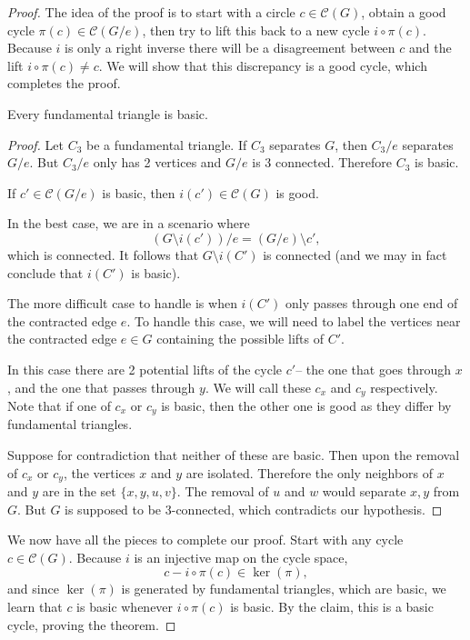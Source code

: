 \begin{proof}
	The idea of the proof is to start with a circle $c\in \mathcal C(G)$, obtain a good cycle $\pi(c)\in \mathcal C(G/e)$, then try to lift this back to a new cycle $i\circ \pi(c)$. 
	Because $i$ is only a right inverse there will be a disagreement between $c$ and the lift $i\circ \pi(c)\neq c$.
	We will show that this discrepancy is a good cycle, which completes the proof. 
	\begin{claim}
		Every fundamental triangle is basic.
	\end{claim}
	\begin{proof}
	 Let $C_3$ be a fundamental triangle. If $C_3$ separates $G$, then $C_3/e$ separates $G/e$. But $C_3/e$ only has 2 vertices and  $G/e$ is 3 connected. Therefore $C_3$ is basic. 
	 \begin{claim}
		If $c'\in \mathcal C(G/e)$ is basic, then $i(c')\in \mathcal C(G)$ is good.
	 \end{claim}
	 In the best case, we are in a scenario where 
	 \[(G\setminus i(c'))/e=(G/e)\setminus c',\]
	  which is connected. 
	 It follows that $G\setminus i(C')$ is connected (and we may in fact conclude that $i(C')$ is basic).

	 The more difficult case to handle is when $i(C')$ only passes through one end of the contracted edge $e$.
	 To handle this case, we will need to label the vertices near the contracted edge $e\in G$ containing the possible lifts of $C'$. 
	 
In this case there are 2 potential lifts of the cycle $c'$-- the one that goes through $x$, and the one that passes through $y$. We will call these $c_x$ and $c_y$ respectively. Note that if one of $c_x$ or $c_y$ is basic, then the other one is good as they differ by fundamental triangles. 

Suppose for contradiction that neither of these are basic.
Then upon the removal of $c_x$ or $c_y$, the vertices $x$ and $y$ are isolated.
Therefore the only neighbors of $x$ and $y$ are in the set $\{x, y, u, v\}$. The removal of $u$ and $w$ would separate $x, y$ from $G$. But $G$ is supposed to be 3-connected, which contradicts our hypothesis. 
	\end{proof}

We now have all the pieces to complete our proof.
Start with any cycle $c\in \mathcal C(G)$. Because $i$ is an injective map on the cycle space, 
\[c-i\circ \pi (c)\in \ker(\pi),\]
and since $\ker(\pi)$ is generated by fundamental triangles, which are basic, we learn that $c$ is basic whenever $i\circ \pi(c)$  is basic. By the claim, this is a basic cycle, proving the theorem. 
	\end{proof}
